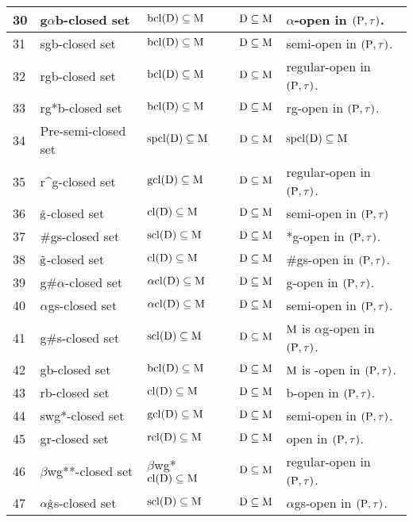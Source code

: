 {\begin{longtable}{|p{1cm}|>{\raggedright}p{5cm}|>{\centering}p{2.5cm}|>{\centering}p{1.7cm}|>{\centering}p{2.8cm}|}
\hline
30 & g$\alpha$b-closed set \cite{Nagaveni7} & $\mathrm{bcl}(\mathrm{D}) \subseteq \mathrm{M}$ & $\mathrm{D} \subseteq \mathrm{M}$ & $\alpha$-open in $(\mathrm{P}, \tau)$.\tabularnewline
\hline
31 & sgb-closed set \cite{Nagaveni7} & $\mathrm{bcl}(\mathrm{D}) \subseteq \mathrm{M}$ & $\mathrm{D} \subseteq \mathrm{M}$ & semi-open in $(\mathrm{P}, \tau)$.\tabularnewline
\hline
32 & rgb-closed set \cite{Mariappa} & $\mathrm{bcl}(\mathrm{D}) \subseteq \mathrm{M}$ & $\mathrm{D} \subseteq \mathrm{M}$ & regular-open in $(\mathrm{P}, \tau)$.\tabularnewline
\hline
33 & rg*b-closed set \cite{Indirani} & $\mathrm{bcl}(\mathrm{D}) \subseteq \mathrm{M}$ & $\mathrm{D} \subseteq \mathrm{M}$ & rg-open in $(\mathrm{P}, \tau)$.\tabularnewline
\hline
34 & Pre-semi-closed set \cite{key} & $\mathrm{spcl}(\mathrm{D}) \subseteq \mathrm{M}$ & $\mathrm{D}\subseteq\mathrm{M}$ & $\mathrm{spcl}(\mathrm{D}) \subseteq \mathrm{M}$\tabularnewline
\hline
35 & r\textasciicircum{g}-closed set \cite{Janaki2} & $\mathrm{gcl}(\mathrm{D}) \subseteq \mathrm{M}$ & $\mathrm{D} \subseteq \mathrm{M}$ & regular-open in $(\mathrm{P}, \tau)$.\tabularnewline
\hline
36 & $\hat{\mathrm{g}}$-closed set \cite{VeeraKumar3} & $\mathrm{cl}(\mathrm{D}) \subseteq \mathrm{M}$ & $\mathrm{D} \subseteq \mathrm{M}$ & semi-open in $(\mathrm{P}, \tau)$\tabularnewline
\hline
37 & \#gs-closed set \cite{key} & $\mathrm{scl}(\mathrm{D}) \subseteq \mathrm{M}$ & $\mathrm{D} \subseteq \mathrm{M}$ & *g-open in $(\mathrm{P}, \tau)$.\tabularnewline
\hline
38 & $\tilde{\mathrm{g}}$-closed set \cite{key} & $\mathrm{cl}(\mathrm{D}) \subseteq \mathrm{M}$ & $\mathrm{D} \subseteq \mathrm{M}$ & \#gs-open in $(\mathrm{P}, \tau)$.\tabularnewline
\hline
39 & g\#$\alpha$-closed set \cite{Devi} & $\alpha\mathrm{cl}(\mathrm{D}) \subseteq \mathrm{M}$ & $\mathrm{D}\subseteq\mathrm{M}$ & g-open in $(\mathrm{P}, \tau)$.\tabularnewline
\hline
40 & $\alpha$gs-closed set \cite{Rajamani} & $\alpha\mathrm{cl}(\mathrm{D}) \subseteq \mathrm{M}$ & $\mathrm{D} \subseteq \mathrm{M}$ & semi-open in $(\mathrm{P}, \tau)$.\tabularnewline
\hline
41 & g\#s-closed set \cite{VeeraKumar1} & $\mathrm{scl}(\mathrm{D}) \subseteq \mathrm{M}$ & $\mathrm{D} \subseteq \mathrm{M}$ & $\mathrm{M}$ is $\alpha$g-open in $(\mathrm{P}, \tau)$.\tabularnewline
\hline
42 & gb-closed set \cite{Ahmad} & $\mathrm{bcl}(\mathrm{D}) \subseteq \mathrm{M}$ & $\mathrm{D} \subseteq \mathrm{M}$ & $\mathrm{M}$ is -open in $(\mathrm{P}, \tau)$.\tabularnewline
\hline
43 & rb-closed set \cite{Nagaveni2} & $\mathrm{cl}(\mathrm{D}) \subseteq \mathrm{M}$ & $\mathrm{D} \subseteq \mathrm{M}$ & b-open in $(\mathrm{P}, \tau)$.\tabularnewline
\hline
44 & swg*-closed set \cite{Nagaveni} & $\mathrm{gcl}(\mathrm{D}) \subseteq \mathrm{M}$ & $\mathrm{D} \subseteq \mathrm{M}$ & semi-open in $(\mathrm{P}, \tau)$.\tabularnewline
\hline
45 & gr-closed set \cite{Bhattacharya1} & $\mathrm{rcl}(\mathrm{D}) \subseteq \mathrm{M}$ & $\mathrm{D} \subseteq \mathrm{M}$ & open in $(\mathrm{P}, \tau)$.\tabularnewline
\hline
46 & $\beta$wg{*}{*}-closed set \cite{Subashini} & $\beta$wg*$\mathrm{cl}(\mathrm{D}) \subseteq \mathrm{M}$ & $\mathrm{D} \subseteq \mathrm{M}$ & regular-open in $(\mathrm{P}, \tau)$.\tabularnewline
\hline
47 & $\alpha\hat{\mathrm{g}}$s-closed set \cite{key} & $\mathrm{scl}(\mathrm{D}) \subseteq \mathrm{M}$ & $\mathrm{D} \subseteq \mathrm{M}$ & $\alpha$gs-open in $(\mathrm{P}, \tau)$.\tabularnewline

\end{longtable}}
